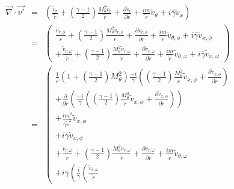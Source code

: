 \documentclass[12pt]{article}
\begin{document}
\begin{eqnarray}
\vec{\nabla} \cdot \vec{v'} &=&
\left(
\frac{ \widetilde{v}_r}{\widetilde{r}}
+
\left(
\frac{\gamma-1}{2}
\right)
\frac{
M_{\theta}^2
 \widetilde{v}_r
}{\widetilde{r}}
+ \frac{\partial \widetilde{v}_r}{\partial \widetilde{r}}
+ \frac{i m}{\widetilde{r}} \widetilde{v}_{\theta}
+ i \overline{\gamma} \widetilde{v}_x
\right)
\nonumber
\\
&=&
\left(
\begin{array}{r}
\frac{ \widetilde{v}_{r,\phi}}{\widetilde{r}}
+
\left(
\frac{\gamma-1}{2}
\right)
\frac{
M_{\theta}^2
 \widetilde{v}_{r,\phi}
}{\widetilde{r}}
+ \frac{\partial \widetilde{v}_{r,\phi}}{\partial \widetilde{r}}
+ \frac{i m}{\widetilde{r}} \widetilde{v}_{\theta,\phi}
+ i \overline{\gamma} \widetilde{v}_{x,\phi}
\\
+\frac{ \widetilde{v}_{r,\omega}}{\widetilde{r}}
+
\left(
\frac{\gamma-1}{2}
\right)
\frac{
M_{\theta}^2
 \widetilde{v}_{r,\omega}
}{\widetilde{r}}
+ \frac{\partial \widetilde{v}_{r,\omega}}{\partial \widetilde{r}}
+ \frac{i m}{\widetilde{r}} \widetilde{v}_{\theta,\omega}
+ i \overline{\gamma} \widetilde{v}_{x,\omega}
\end{array}
\right)
\nonumber
\\
&=&
\left(
\begin{array}{r}
\frac{1}{\widetilde{r}}
\left(
1
+
\left(
\frac{\gamma-1}{2}
\right)
M_{\theta}^2
\right)
\frac{-i}{ \overline{\gamma}}
\left(
\left(\frac{\gamma-1}{2} \right)
\frac{M_{\theta}^2}{\widetilde{r}}
\widetilde{v}_{x,\phi}
+
\frac{\partial \widetilde{v}_{x,\phi}}{\partial \widetilde{r}} 
\right)
\\
+ \frac{\partial }{\partial \widetilde{r}}
\left(
\frac{-i}{ \overline{\gamma}}
\left(
\left(\frac{\gamma-1}{2} \right)
\frac{M_{\theta}^2}{\widetilde{r}}
\widetilde{v}_{x,\phi}
+
\frac{\partial \widetilde{v}_{x,\phi}}{\partial \widetilde{r}} 
\right)
\right)
\\
+ \frac{i m^2}
{\overline{\gamma} \widetilde{r}^2} \widetilde{v}_{x,\phi}
\\
+ i \overline{\gamma} \widetilde{v}_{x,\phi}
\\
+\frac{ \widetilde{v}_{r,\omega}}{\widetilde{r}}
+
\left(
\frac{\gamma-1}{2}
\right)
\frac{
M_{\theta}^2
 \widetilde{v}_{r,\omega}
}{\widetilde{r}}
+ \frac{\partial \widetilde{v}_{r,\omega}}{\partial \widetilde{r}}
+ \frac{i m}{\widetilde{r}} \widetilde{v}_{\theta,\omega}
\\
+ i \overline{\gamma} 
\left(
\frac{i}{\overline{\gamma}}
\left(
\frac{ \widetilde{v}_{r,\omega}}{\widetilde{r}}

\end{array}
\end{eqnarray}
\end{document}
